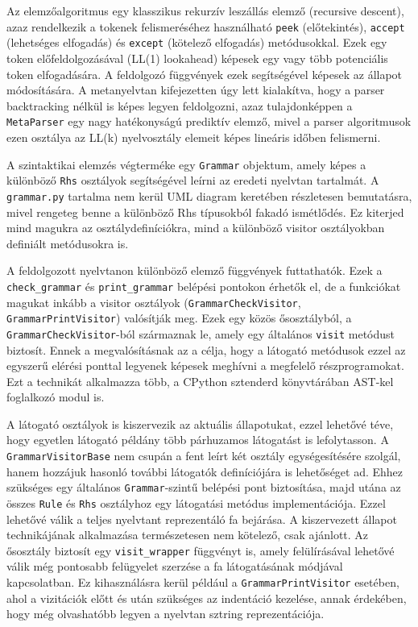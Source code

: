 \documentclass[twoside, 12pt]{report}
\begin{document}
Az elemzőalgoritmus egy klasszikus rekurzív leszállás elemző (recursive descent), azaz rendelkezik a tokenek felismeréséhez használható \verb|peek| (előtekintés), \verb|accept| (lehetséges elfogadás) és \verb|except| (kötelező elfogadás) metódusokkal. Ezek egy token előfeldolgozásával (LL(1) lookahead) képesek egy vagy több potenciális token elfogadására. A feldolgozó függvények ezek segítségével képesek az állapot módosítására. A metanyelvtan kifejezetten úgy lett kialakítva, hogy a parser backtracking nélkül is képes legyen feldolgozni, azaz tulajdonképpen a \verb|MetaParser| egy nagy hatékonyságú prediktív elemző, mivel a parser algoritmusok ezen osztálya az LL(k) nyelvosztály elemeit képes lineáris időben felismerni.

A szintaktikai elemzés végterméke egy \verb|Grammar| objektum, amely képes a különböző \verb|Rhs| osztályok segítségével leírni az eredeti nyelvtan tartalmát. A \verb|grammar.py| tartalma nem kerül UML diagram keretében részletesen bemutatásra, mivel rengeteg benne a különböző Rhs típusokból fakadó ismétlődés. Ez kiterjed mind magukra az osztálydefiníciókra, mind a különböző visitor osztályokban definiált metódusokra is.

A feldolgozott nyelvtanon különböző elemző függvények futtathatók. Ezek a \verb|check_grammar| és \verb|print_grammar| belépési pontokon érhetők el, de a funkciókat magukat inkább a visitor osztályok (\verb|GrammarCheckVisitor|, \verb|GrammarPrintVisitor|) valósítják meg. Ezek egy közös ősosztályból, a \verb|GrammarCheckVisitor|-ból származnak le, amely egy általános \verb|visit| metódust biztosít. Ennek a megvalósításnak az a célja, hogy a látogató metódusok ezzel az egyszerű elérési ponttal legyenek képesek meghívni a megfelelő részprogramokat. Ezt a technikát alkalmazza több, a CPython sztenderd könyvtárában AST-kel foglalkozó modul is.

A látogató osztályok is kiszervezik az aktuális állapotukat, ezzel lehetővé téve, hogy egyetlen látogató példány több párhuzamos látogatást is lefolytasson. A \verb|GrammarVisitorBase| nem csupán a fent leírt két osztály egységesítésére szolgál, hanem hozzájuk hasonló további látogatók definíciójára is lehetőséget ad. Ehhez szükséges egy általános \verb|Grammar|-szintű belépési pont biztosítása, majd utána az összes \verb|Rule| és \verb|Rhs| osztályhoz egy látogatási metódus implementációja. Ezzel lehetővé válik a teljes nyelvtant reprezentáló fa bejárása. A kiszervezett állapot technikájának alkalmazása természetesen nem kötelező, csak ajánlott. Az ősosztály biztosít egy \verb|visit_wrapper| függvényt is, amely felülírásával lehetővé válik még pontosabb felügyelet szerzése a fa látogatásának módjával kapcsolatban. Ez kihasználásra kerül például a \verb|GrammarPrintVisitor| esetében, ahol a vizitációk előtt és után szükséges az indentáció kezelése, annak érdekében, hogy még olvashatóbb legyen a nyelvtan sztring reprezentációja.
\end{document}
